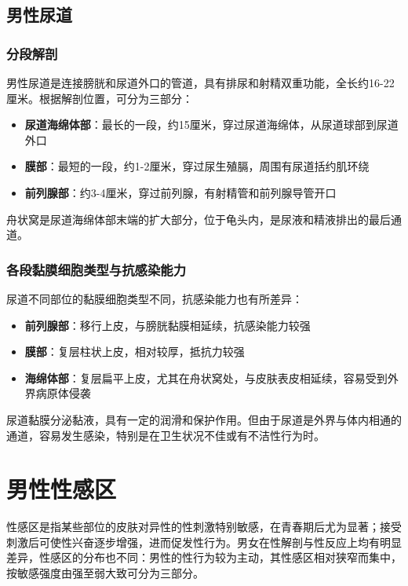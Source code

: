 \documentclass[12pt,a4paper,twoside]{ctexbook}
\begin{document}
\subsection{男性尿道}
\subsubsection{分段解剖}

男性尿道是连接膀胱和尿道外口的管道，具有排尿和射精双重功能，全长约16-22厘米。根据解剖位置，可分为三部分：

\begin{itemize}
    \item \textbf{尿道海绵体部}：最长的一段，约15厘米，穿过尿道海绵体，从尿道球部到尿道外口
    \item \textbf{膜部}：最短的一段，约1-2厘米，穿过尿生殖膈，周围有尿道括约肌环绕
    \item \textbf{前列腺部}：约3-4厘米，穿过前列腺，有射精管和前列腺导管开口
\end{itemize}

舟状窝是尿道海绵体部末端的扩大部分，位于龟头内，是尿液和精液排出的最后通道。

\subsubsection{各段黏膜细胞类型与抗感染能力}

尿道不同部位的黏膜细胞类型不同，抗感染能力也有所差异：

\begin{itemize}
    \item \textbf{前列腺部}：移行上皮，与膀胱黏膜相延续，抗感染能力较强
    \item \textbf{膜部}：复层柱状上皮，相对较厚，抵抗力较强
    \item \textbf{海绵体部}：复层扁平上皮，尤其在舟状窝处，与皮肤表皮相延续，容易受到外界病原体侵袭
\end{itemize}

尿道黏膜分泌黏液，具有一定的润滑和保护作用。但由于尿道是外界与体内相通的通道，容易发生感染，特别是在卫生状况不佳或有不洁性行为时。


\section{男性性感区}

性感区是指某些部位的皮肤对异性的性刺激特别敏感，在青春期后尤为显著；接受刺激后可使性兴奋逐步增强，进而促发性行为。男女在性解剖与性反应上均有明显差异，性感区的分布也不同：男性的性行为较为主动，其性感区相对狭窄而集中，按敏感强度由强至弱大致可分为三部分。
\end{document}
